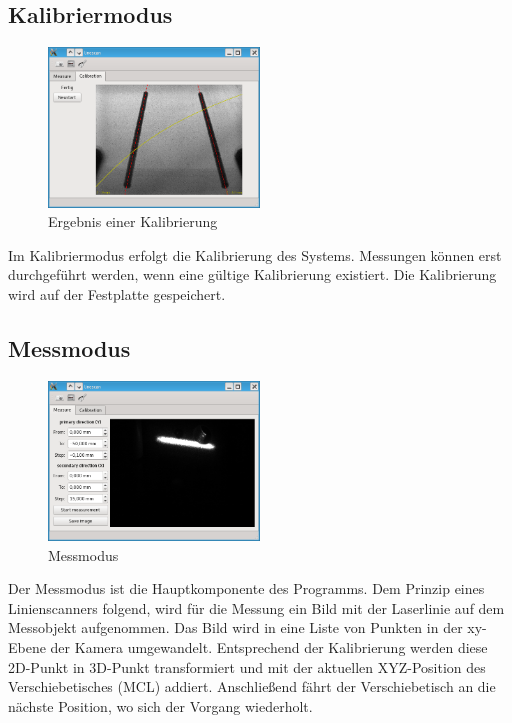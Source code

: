 \documentclass[a4paper,10pt]{scrartcl}
\begin{document}
\subsection{Kalibriermodus}

\begin{figure}[H]
  \centering
  \includegraphics[width=0.5\textwidth]{include/calib.png}
  \caption{Ergebnis einer Kalibrierung}
  \label{fig:overview}
\end{figure}

Im Kalibriermodus erfolgt die Kalibrierung des Systems. Messungen können erst durchgeführt werden,
wenn eine gültige Kalibrierung existiert. Die Kalibrierung wird auf der Festplatte gespeichert.

\subsection{Messmodus}

\begin{figure}[H]
  \centering
  \includegraphics[width=0.5\textwidth]{include/measure.png}
  \caption{Messmodus}
  \label{fig:overview}
\end{figure}

Der Messmodus ist die Hauptkomponente des Programms. Dem Prinzip eines Linienscanners folgend,
wird für die Messung ein Bild mit der Laserlinie auf dem Messobjekt aufgenommen. Das Bild wird
in eine Liste von Punkten in der xy-Ebene der Kamera umgewandelt. Entsprechend der Kalibrierung
werden diese 2D-Punkt in 3D-Punkt transformiert und mit der aktuellen XYZ-Position des
Verschiebetisches (MCL) addiert. Anschließend fährt der Verschiebetisch an die nächste Position,
wo sich der Vorgang wiederholt.
\end{document}
